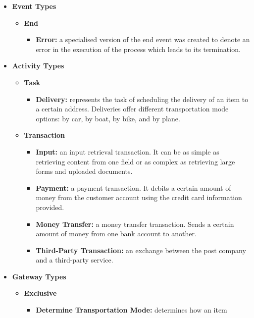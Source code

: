 \documentclass[11pt, a4paper, oneside, openright]{article}
\begin{document}
\begin{itemize}
  \item \textbf{Event Types}
  \begin{itemize}
    \item \textbf{End}
    \begin{itemize}
      \item \textbf{Error:} a specialised version of the end event was created
      to denote an error in the execution of the process which leads to its
      termination.
    \end{itemize}
  \end{itemize}
  \item \textbf{Activity Types}
  \begin{itemize}
    \item \textbf{Task}
    \begin{itemize}
      \item \textbf{Delivery:} represents the task of scheduling the delivery of
      an item to a certain address. Deliveries offer different transportation
      mode options: by car, by boat, by bike, and by plane.
    \end{itemize}
    \item \textbf{Transaction}
    \begin{itemize}
      \item \textbf{Input:} an input retrieval transaction. It can be as simple
      as retrieving content from one field or as complex as retrieving large
      forms and uploaded documents.
      \item \textbf{Payment:} a payment transaction. It debits a certain amount
      of money from the customer account using the credit card information
      provided.
      \item \textbf{Money Transfer:} a money transfer transaction. Sends a
      certain amount of money from one bank account to another.
      \item \textbf{Third-Party Transaction:} an exchange between the post
      company and a third-party service.
    \end{itemize}
  \end{itemize}
  \item \textbf{Gateway Types}
  \begin{itemize}
    \item \textbf{Exclusive}
    \begin{itemize}
      \item \textbf{Determine Transportation Mode:} determines how an item

\end{itemize}
\end{itemize}
\end{itemize}
\end{document}

